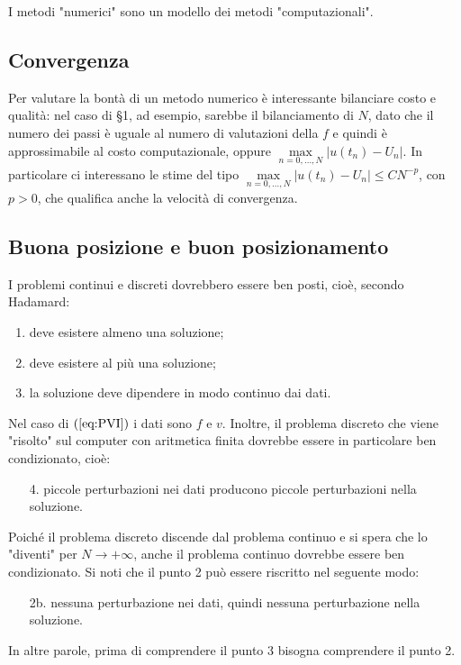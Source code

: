 \documentclass[hidelinks, 10pt]{report}
\begin{document}
I metodi "numerici" sono un modello dei metodi "computazionali".

\subsection{Convergenza}
Per valutare la bont\`a  di un metodo numerico \`e interessante bilanciare costo e qualit\`a: nel caso di \S 1, ad esempio, sarebbe il bilanciamento di $ N $, dato che il numero dei passi \`e uguale al numero di valutazioni della $ f $ e quindi \`e approssimabile al costo computazionale, oppure  $ \max\limits_{n = 0, \dotsc, N} \vert u(t_{n})  - U_{n} \vert $. In particolare ci interessano le stime del tipo $ \max\limits_{n = 0, \dotsc, N} \vert u(t_{n})  - U_{n} \vert \le C N^{-p} $, con $ p > 0 $, che qualifica anche la velocit\`a di convergenza.

\subsection{Buona posizione e buon posizionamento}
I problemi continui e discreti dovrebbero essere ben posti, cio\`e, secondo Hadamard:
\begin{enumerate}
\item deve esistere almeno una soluzione;
\item deve esistere al pi\`u una soluzione;
\item la soluzione deve dipendere in modo continuo dai dati.
\end{enumerate}

Nel caso di $ (\ref{eq:PVI}) $ i dati sono $ f $ e $ v $. Inoltre, il problema discreto che viene "risolto" sul computer con aritmetica finita dovrebbe essere in particolare ben condizionato, cio\`e:
\begin{enumerate}
\item[4.] piccole perturbazioni nei dati producono piccole perturbazioni nella soluzione.
\end{enumerate}

Poich\'e il problema discreto discende dal problema continuo e si spera che lo "diventi" per $ N \to +\infty $, anche il problema continuo dovrebbe essere ben condizionato. Si noti che il punto 2 pu\`o essere riscritto nel seguente modo:
\begin{enumerate}
\item[2b.] nessuna perturbazione nei dati, quindi nessuna perturbazione nella soluzione.  
\end{enumerate}

In altre parole, prima di comprendere il punto 3 bisogna comprendere il punto 2.
\end{document}
